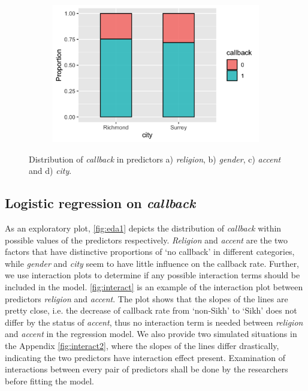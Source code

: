 \documentclass[11pt]{article}
\begin{document}
\begin{figure}[!b]
\begin{subfigure}{0.45\textwidth}
        \caption{}
    \end{subfigure}
    \begin{subfigure}{0.45\textwidth}
        \centering
        \includegraphics[width=\textwidth]{../../Plots/Proportions_callback_city.png}
        \caption{}
    \end{subfigure}
    \caption{Distribution of \textit{callback} in predictors a) \textit{religion}, b) \textit{gender}, c) \textit{accent} and d) \textit{city}.}
    \label{fig:eda1}
\end{figure}





\subsection{Logistic regression on \textit{callback}}
\label{sec:logit}

As an exploratory plot, \autoref{fig:eda1} depicts the distribution of \textit{callback} within possible values of the predictors respectively. \textit{Religion} and \textit{accent} are the two factors that have distinctive proportions of `no callback' in different categories, while \textit{gender} and \textit{city} seem to have little influence on the callback rate. Further, we use interaction plots to determine if any possible interaction terms should be included in the model. \autoref{fig:interact} is an example of the interaction plot between predictors \textit{religion} and \textit{accent}. The plot shows that the slopes of the lines are pretty close, i.e. the decrease of callback rate from `non-Sikh' to `Sikh' does not differ by the status of \textit{accent}, thus no interaction term is needed between \textit{religion} and \textit{accent} in the regression model. We also provide two simulated situations in the Appendix \autoref{fig:interact2}, where the slopes of the lines differ drastically, indicating the two predictors have interaction effect present. Examination of interactions between every pair of predictors shall be done by the researchers before fitting the model.
\end{document}
